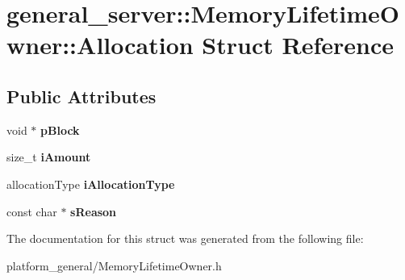 \hypertarget{structgeneral__server_1_1MemoryLifetimeOwner_1_1Allocation}{\section{general\-\_\-server\-:\-:\-Memory\-Lifetime\-Owner\-:\-:\-Allocation \-Struct \-Reference}
\label{structgeneral__server_1_1MemoryLifetimeOwner_1_1Allocation}
}
\subsection*{\-Public \-Attributes}
\begin{DoxyCompactItemize}
\item 
\hypertarget{structgeneral__server_1_1MemoryLifetimeOwner_1_1Allocation_ab29d78c103434f729383dd6be84e38a6}{void $\ast$ {\bfseries p\-Block}}\label{structgeneral__server_1_1MemoryLifetimeOwner_1_1Allocation_ab29d78c103434f729383dd6be84e38a6}

\item 
\hypertarget{structgeneral__server_1_1MemoryLifetimeOwner_1_1Allocation_a179358638943fae8ee8006d4be7b6cea}{size\-\_\-t {\bfseries i\-Amount}}\label{structgeneral__server_1_1MemoryLifetimeOwner_1_1Allocation_a179358638943fae8ee8006d4be7b6cea}

\item 
\hypertarget{structgeneral__server_1_1MemoryLifetimeOwner_1_1Allocation_aad8b20ed80c1d51e194fe1b4f5553d4c}{allocation\-Type {\bfseries i\-Allocation\-Type}}\label{structgeneral__server_1_1MemoryLifetimeOwner_1_1Allocation_aad8b20ed80c1d51e194fe1b4f5553d4c}

\item 
\hypertarget{structgeneral__server_1_1MemoryLifetimeOwner_1_1Allocation_a400b6351a69c5e43209c6f1755e8bb64}{const char $\ast$ {\bfseries s\-Reason}}\label{structgeneral__server_1_1MemoryLifetimeOwner_1_1Allocation_a400b6351a69c5e43209c6f1755e8bb64}

\end{DoxyCompactItemize}


\-The documentation for this struct was generated from the following file\-:\begin{DoxyCompactItemize}
\item 
platform\-\_\-general/\-Memory\-Lifetime\-Owner.\-h\end{DoxyCompactItemize}
